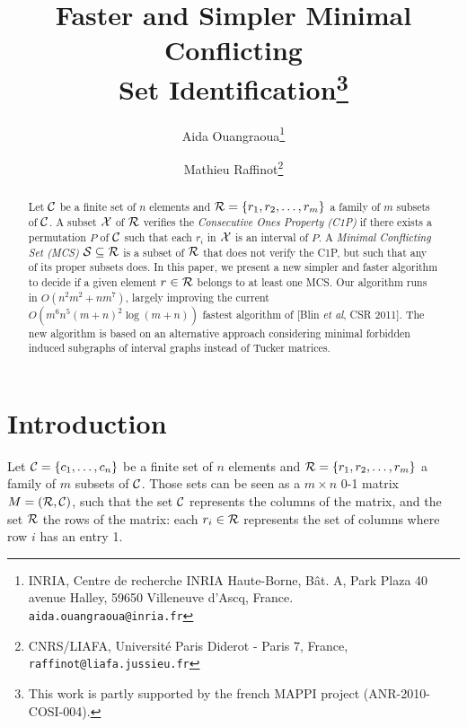 \documentclass{article}
\begin{document}
\title{\vspace*{-2cm}Faster and Simpler Minimal Conflicting\\ Set
  Identification\thanks{This work is partly supported by the french MAPPI project
    (ANR-2010-COSI-004).}}

\author{Aida Ouangraoua\thanks{INRIA, Centre de recherche INRIA
    Haute-Borne, Bât. A, Park Plaza 40 avenue Halley, 59650 Villeneuve
    d'Ascq, France.  {\tt aida.ouangraoua@inria.fr}} \and Mathieu
  Raffinot\thanks{CNRS/LIAFA, Universit\'e Paris Diderot - Paris 7,
    France, {\tt raffinot@liafa.jussieu.fr}} 
}

\maketitle


\begin{abstract}
Let ${\cal C}$ be a finite set of $n$ elements and ${\cal
  R}=\{r_1,r_2, \ldots , r_m\}$ a family of $m$ subsets of ${\cal
  C}$. A subset ${\cal X}$ of ${\cal R}$ verifies the \emph{Consecutive Ones
Property (C1P)} if there exists a permutation $P$ of ${\cal C}$ such
that each $r_i$ in ${\cal X}$ is an interval of $P$. A \emph{Minimal
Conflicting Set (MCS)} ${\cal S} \subseteq {\cal R}$ is a subset of
 ${\cal R}$ that does not verify the C1P, but such that any of its proper 
subsets does. In this paper, we present a new simpler and faster algorithm 
to decide if a given element $r \in {\cal R}$ belongs to at least one MCS. 
Our algorithm runs in $O(n^2m^2 + nm^7)$, largely improving
the current $O(m^6n^5 (m+n)^2 \log(m+n))$ fastest algorithm of
[Blin {\em et al}, CSR 2011]. The new algorithm is based on an alternative
approach considering minimal forbidden induced subgraphs of interval
graphs instead of Tucker matrices.
\end{abstract}  


\section{Introduction}

Let ${\cal C} = \{c_1, \ldots ,c_n\}$ be a finite set of $n$ elements
and ${\cal R}=\{r_1,r_2, \ldots , r_m\}$ a family of $m$ subsets of
${\cal C}$. Those sets can be seen as a $m \times n$ 0-1 matrix
$M=({\cal R}, {\cal C})$, such that the set ${\cal C}$ represents the 
columns of the matrix, and the set ${\cal R}$ the rows of the matrix:
each $r_i\in {\cal R}$ represents the set of columns where row $i$ has
an entry 1.
\end{document}
